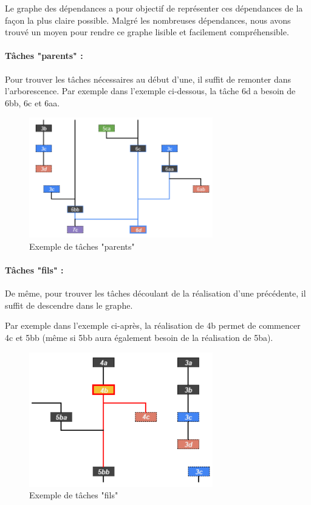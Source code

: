 \documentclass[a4paper,12pt]{article} %
\begin{document}
Le graphe des dépendances a pour objectif de représenter ces dépendances de la façon la plus claire possible. Malgré les nombreuses dépendances, nous avons trouvé un moyen pour rendre ce graphe lisible et facilement compréhensible.

\paragraph{Tâches "parents" :\\}

Pour trouver les tâches nécessaires au début d’une, il suffit de remonter dans l’arborescence. Par exemple dans l’exemple ci-dessous, la tâche 6d a besoin de 6bb, 6c et 6aa.

\begin{figure}[h]
\begin{center}
\includegraphics[width=8cm]{tacheparent.png} 
\end{center}
\caption{Exemple de tâches "parents"}
\end{figure}

\paragraph{Tâches "fils" :\\}

De même, pour trouver les tâches découlant de la réalisation d’une précédente, il suffit de descendre dans le graphe.

Par exemple dans l’exemple ci-après, la réalisation de 4b permet de commencer 4c et 5bb
(même si 5bb aura également besoin de la réalisation de 5ba).

\begin{figure}[h]
\begin{center}
\includegraphics[width=8cm]{tachefils.png} 
\end{center}
\caption{Exemple de tâches "fils"}
\end{figure}
\end{document}
